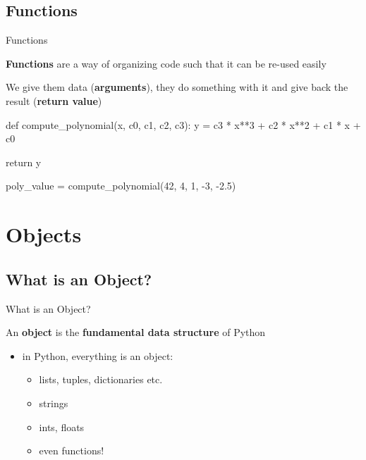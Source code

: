 \subsection{Functions}

\begin{frame}[fragile]{Functions}

    \begin{block}{}
        {\bf Functions} are a way of organizing code such that it can be re-used easily
    \end{block}

    We give them data ({\bf arguments}), they do something with it and give back the result ({\bf return value})

    \vspace{1em}

    \begin{pythoncode}
    def compute_polynomial(x, c0, c1, c2, c3):
        y = c3 * x**3 + c2 * x**2 + c1 * x + c0

        return y

    poly_value = compute_polynomial(42, 4, 1, -3, -2.5)
    \end{pythoncode}


\end{frame}

\section{Objects}

\begin{frame}[plain]
    \sectionpage
\end{frame}

\subsection{What is an Object?}

\begin{frame}{What is an Object?}

    \begin{block}{}
        An \textbf{object} is the \textbf{fundamental data structure} of Python
    \end{block}

    \begin{itemize}
        \item in Python, everything is an object:
        \begin{itemize}
            \item lists, tuples, dictionaries etc.
            \item strings
            \item ints, floats
            \item even functions!
        \end{itemize}
    \end{itemize}

\end{frame}

